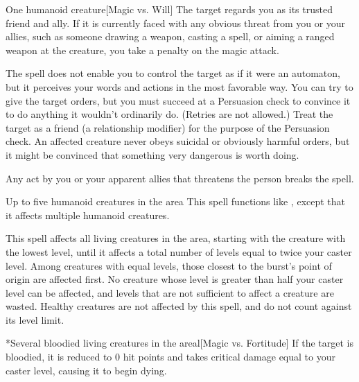\spellrng{\rngmed}
\spelldur{\durlong}
\begin{spelltarget}{One humanoid creature}[Magic vs. Will]
    \spellsuccess The target regards you as its trusted friend and ally. If it is currently faced with any obvious threat from you or your allies, such as someone drawing a weapon, casting a spell, or aiming a ranged weapon at the creature, you take a  penalty on the magic attack.
    \par The spell does not enable you to control the target as if it were an automaton, but it perceives your words and actions in the most favorable way. You can try to give the target orders, but you must succeed at a Persuasion check to convince it to do anything it wouldn't ordinarily do. (Retries are not allowed.) Treat the target as a friend (a  relationship modifier) for the purpose of the Persuasion check. An affected creature never obeys suicidal or obviously harmful orders, but it might be convinced that something very dangerous is worth doing.
\end{spelltarget}
\spellnotes Any act by you or your apparent allies that threatens the  person breaks the spell.

\norepeatspellnotes

\begin{spelltargets}{Up to five humanoid creatures in the area}
    \spellsuccess This spell functions like , except that it affects multiple humanoid creatures.
\end{spelltargets}

\spellline
\spelleffect This spell affects all \bloodied living creatures in the area, starting with the creature with the lowest level, until it affects a total number of levels equal to twice your caster level. Among creatures with equal levels, those closest to the burst's point of origin are affected first. No creature whose level is greater than half your caster level can be affected, and levels that are not sufficient to affect a creature are wasted. Healthy creatures are not affected by this spell, and do not count against its level limit.
\begin{spelltargets}*{Several bloodied living creatures in the area}l[Magic vs. Fortitude]
    \spellsuccess If the target is bloodied, it is reduced to 0 hit points and takes critical damage equal to your caster level, causing it to begin dying.
\end{spelltargets}
\spellline
{}


